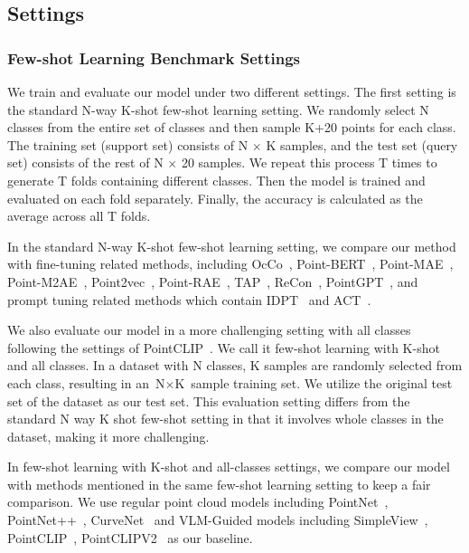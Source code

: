 \documentclass{ecai}
\begin{document}
\subsection{Settings}
\subsubsection{Few-shot Learning Benchmark Settings}\label{Benchmark}
We train and evaluate our model under two different settings. 
The first setting is the standard N-way K-shot few-shot learning setting. We randomly select N classes from the entire set of classes and then sample K+20 points for each class. The training set (support set) consists of N $\times$ K samples, and the test set (query set) consists of the rest of N $\times$ 20 samples. We repeat this process T times to generate T folds containing different classes. Then the model is trained and evaluated on each fold separately. Finally, the accuracy is calculated as the average across all T folds. 

In the standard N-way K-shot few-shot learning setting, we compare our method with fine-tuning related methods, including OcCo~\cite{wang2021unsupervised}, Point-BERT~\cite{yu2022point}, Point-MAE~\cite{pang2022masked}, Point-M2AE~\cite{zhang2022point}, Point2vec~\cite{abou2023point2vec}, Point-RAE~\cite{liu2023regress}, TAP~\cite{wang2023take}, ReCon~\cite{qi2023contrast}, PointGPT~\cite{chen2024pointgpt}, and prompt tuning related methods which contain IDPT~\cite{zha2023instance} and ACT~\cite{dong2022autoencoders}.

We also evaluate our model in a more challenging setting with all classes following the settings of PointCLIP~\cite{zhang2022pointclip}. We call it few-shot learning with K-shot and all classes. In a dataset with N classes, K samples are randomly selected from each class, resulting in an $\text{N}\times \text{K}$ sample training set. We utilize the original test set of the dataset as our test set. This evaluation setting differs from the standard N way K shot few-shot setting in that it involves whole classes in the dataset, making it more challenging. 

In few-shot learning with K-shot and all-classes settings, we compare our model with methods mentioned in the same few-shot learning setting to keep a fair comparison. We use regular point cloud models including PointNet~\cite{qi2017pointnet}, PointNet++~\cite{qi2017pointnet++}, CurveNet~\cite{muzahid2020curvenet} and VLM-Guided models including SimpleView~\cite{goyal2021revisiting}, PointCLIP~\cite{zhang2022pointclip}, PointCLIPV2~\cite{zhu2023pointclip} as our baseline.
\end{document}
